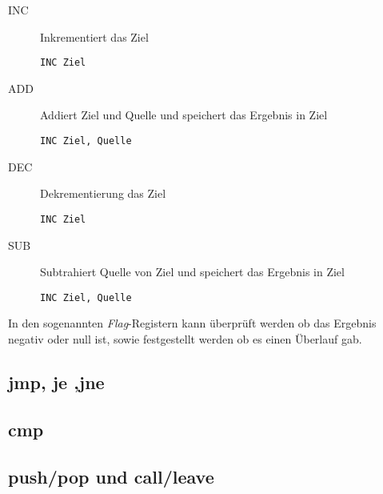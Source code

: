 \begin{description}
	\item [INC] Inkrementiert das Ziel
		\begin{verbatim}INC Ziel\end{verbatim}

	\item [ADD] Addiert Ziel und Quelle und speichert das Ergebnis in Ziel
		\begin{verbatim}INC Ziel, Quelle\end{verbatim}

	\item [DEC] Dekrementierung  das Ziel
		\begin{verbatim}INC Ziel\end{verbatim}

	\item [SUB] Subtrahiert Quelle von Ziel und speichert das Ergebnis in Ziel
		\begin{verbatim}INC Ziel, Quelle\end{verbatim}
\end{description}

In den sogenannten \textit{Flag}-Registern kann überprüft werden ob das Ergebnis negativ oder null ist, sowie festgestellt werden ob es einen Überlauf gab.

\subsection{jmp, je ,jne}

\subsection{cmp}

\subsection{push/pop und call/leave}

